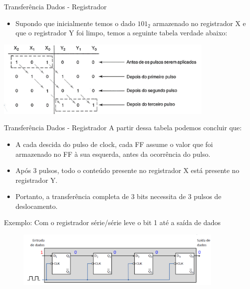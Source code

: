 \documentclass{beamer}
\begin{document}
\begin{frame}{Transferência Dados - Registrador }
\begin{itemize}
    \item Supondo que inicialmente temos o dado $101_{2}$ armazenado no registrador X e que o registrador Y foi limpo, temos a seguinte tabela verdade abaixo: 

\end{itemize}
 
\centering
\includegraphics[width=0.8\textwidth]{figures/seq_clock.png}

\end{frame}


\begin{frame}{Transferência Dados - Registrador }
A partir dessa tabela podemos concluir que:
\begin{itemize}
    \item A cada descida do pulso de clock, cada FF assume o valor que foi armazenado no FF à sua esquerda, antes da ocorrência do pulso. 

    \item Após 3 pulsos, todo o conteúdo presente no registrador X está presente no registrador Y.

    \item Portanto, a transferência completa de 3 bits necessita de 3 pulsos de deslocamento. 


\end{itemize}


\end{frame}


\begin{frame}{Exemplo: Com o registrador série/série leve o bit 1 até a saída de dados
 }

\begin{figure}
\centering
\includegraphics[width=0.9\textwidth]{figures/seq_1.png}
\end{figure}


\end{frame}
\end{document}
